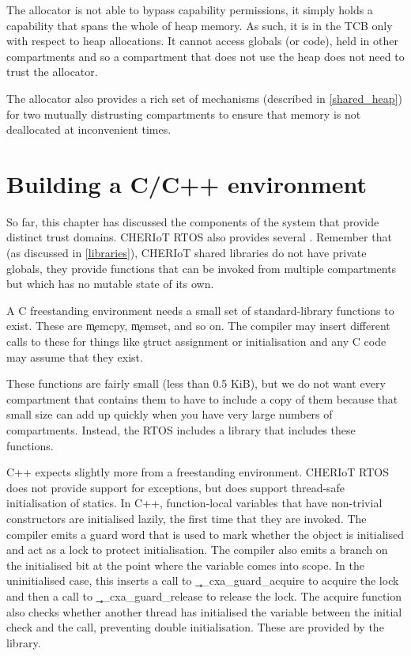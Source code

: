 The allocator is not able to bypass capability permissions, it simply holds a capability that spans the whole of heap memory.
As such, it is in the TCB only with respect to heap allocations.
It cannot access globals (or code), held in other compartments and so a compartment that does not use the heap does not need to trust the allocator.

The allocator also provides a rich set of mechanisms (described in \ref{shared_heap}) for two mutually distrusting compartments to ensure that memory is not deallocated at inconvenient times.

\section{Building a C/C++ environment}

So far, this chapter has discussed the components of the system that provide distinct trust domains.
CHERIoT RTOS also provides several .
Remember that (as discussed in \ref{libraries}), CHERIoT shared libraries do not have private globals, they provide functions that can be invoked from multiple compartments but which has no mutable state of its own.

A C freestanding environment needs a small set of standard-library functions to exist.
These are \c{memcpy}, \c{memset}, and so on.
The compiler may insert different calls to these for things like \c{struct} assignment or initialisation and any C code may assume that they exist.

These functions are fairly small (less than 0.5 KiB), but we do not want every compartment that contains them to have to include a copy of them because that small size can add up quickly when you have very large numbers of compartments.
Instead, the RTOS includes a  library that includes these functions.

C++ expects slightly more from a freestanding environment.
CHERIoT RTOS does not provide support for exceptions, but does support thread-safe initialisation of statics.
In C++, function-local  variables that have non-trivial constructors are initialised lazily, the first time that they are invoked.
The compiler emits a guard word that is used to mark whether the object is initialised and act as a lock to protect initialisation.
The compiler also emits a branch on the initialised bit at the point where the variable comes into scope.
In the uninitialised case, this inserts a call to \c{__cxa_guard_acquire} to acquire the lock and then a call to \c{__cxa_guard_release} to release the lock.
The acquire function also checks whether another thread has initialised the variable between the initial check and the call, preventing double initialisation.
These are provided by the  library.

